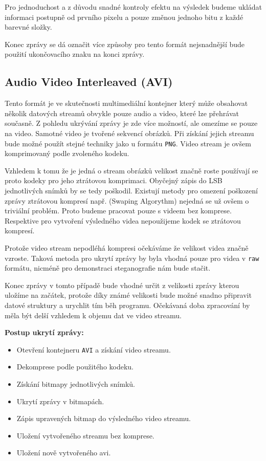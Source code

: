 \documentclass[12pt]{article}
\begin{document}
Pro jednoduchost a z důvodu snadné kontroly efektu na výsledek budeme ukládat informaci postupně od prvního pixelu a pouze změnou jednoho bitu z každé barevné složky.

Konec zprávy se dá označit více způsoby pro tento formát nejsnadnější bude použití ukončovacího znaku na konci zprávy.

\pagebreak
\subsection{Audio Video Interleaved (AVI)}
Tento formát je ve skutečnosti multimediální kontejner který může obsahovat několik datových streamů obvykle pouze audio a video, které lze přehrávat současně. Z pohledu ukrývání zprávy je zde více možností, ale omezíme se pouze na video. Samotné video je tvořené sekvencí obrázků. Při získání jejich streamu bude možné použít stejné techniky jako u formátu \texttt{PNG}. Video stream je ovšem komprimovaný podle zvoleného kodeku.

Vzhledem k tomu že je jedná o stream obrázků velikost značně roste používají se proto kodeky pro jeho ztrátovou komprimaci. Obyčejný zápis do LSB jednotlivých snímků by se tedy poškodil. Existují metody pro omezení poškození zprávy ztrátovou kompresí např. (Swaping Algorythm) nejedná se už ovšem o triviální problém. Proto budeme pracovat pouze s videem bez komprese. Respektive pro vytvoření výsledného videa nepoužijeme kodek se ztrátovou kompresí.

Protože video stream nepodléhá kompresi očekáváme že velikost videa značně vzroste. Taková metoda pro ukrytí zprávy by byla vhodná pouze pro videa v \texttt{raw} formátu, nicméně pro demonstraci steganografie nám bude stačit.

Konec zprávy v tomto případě bude vhodné určit z velikosti zprávy kterou uložíme na začátek, protože díky známé velikosti bude možné snadno připravit datové struktury a urychlit tím běh programu. Očekávaná doba zpracování by měla být delší vzhledem k objemu dat ve video streamu.

\vspace{2mm}
\textbf{Postup ukrytí zprávy:}
\begin{itemize}
\renewcommand\labelitemi{--}
\setlength\itemsep{1px}
\item Otevření kontejneru \texttt{AVI} a získání video streamu.
\item Dekomprese podle použitého kodeku.
\item Získání bitmapy jednotlivých snímků.
\item Ukrytí zprávy v bitmapách.
\item Zápis upravených bitmap do výsledného video streamu.
\item Uložení vytvořeného streamu bez komprese.
\item Uložení nově vytvořeného avi.
\end{itemize}
\end{document}
